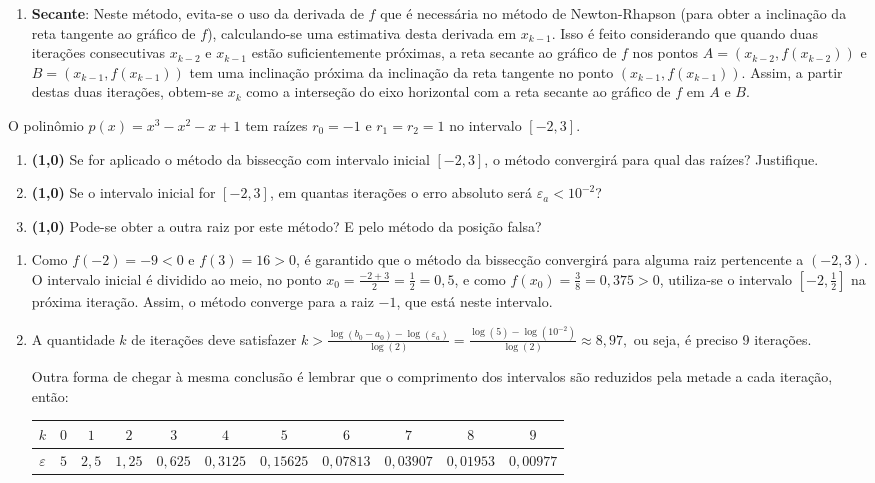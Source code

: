 \documentclass[12pt,a4paper]{article}
\begin{document}
\begin{ExerciseList}
\begin{enumerate}
\item \textbf{Secante}: Neste método, evita-se o uso da derivada de $f$ que é necessária no método de Newton-Rhapson (para obter a inclinação da reta tangente ao gráfico de $f$), calculando-se uma estimativa desta derivada em $x_{k-1}$. Isso é feito considerando que quando duas iterações consecutivas $x_{k-2}$ e $x_{k-1}$ estão suficientemente próximas, a reta secante ao gráfico de $f$ nos pontos $A = (x_{k-2}, f(x_{k-2}))$ e $B = (x_{k-1}, f(x_{k-1}))$ tem uma inclinação próxima da inclinação da reta tangente no ponto $(x_{k-1}, f(x_{k-1}))$. Assim, a partir destas duas iterações, obtem-se $x_k$ como a interseção do eixo horizontal com a reta secante ao gráfico de $f$ em $A$ e $B$.
\end{enumerate}

\Exercise%
O polinômio $p(x) = x^3 - x^2 - x + 1$ tem raízes $r_0 = -1$ e $r_1 = r_2 = 1$ no intervalo $[-2, 3]$.
\begin{enumerate}
\item \textbf{(1,0)} Se for aplicado o método da bissecção com intervalo inicial $[-2, 3]$, o método convergirá para qual das raízes? Justifique.
\item \textbf{(1,0)} Se o intervalo inicial for $[-2,3]$, em quantas iterações o erro absoluto será $\varepsilon_a < 10^{-2}$?
\item \textbf{(1,0)} Pode-se obter a outra raiz por este método? E pelo método da posição falsa?
\end{enumerate}
\Answer

\begin{enumerate}
\item Como $f(-2) = -9 < 0$ e $f(3) = 16 > 0$, é garantido que o método da bissecção convergirá para alguma raiz pertencente a $(-2, 3)$. O intervalo inicial é dividido ao meio, no ponto $x_0 = \frac{-2 + 3}{2} = \frac{1}{2} =0{,}5$, e como $f(x_0) = \frac{3}{8} = 0,375 > 0$, utiliza-se o intervalo $\left[-2, \frac{1}{2} \right]$ na próxima iteração. Assim, o método converge para a raiz $-1$, que está neste intervalo.
\item A quantidade $k$ de iterações deve satisfazer
$
k
> \frac{\log(b_0 - a_0) - \log(\varepsilon_a)}{\log(2)}
= \frac{\log(5) - \log(10^{-2})}{\log(2)}
\approx 8,97,
$
ou seja, é preciso 9 iterações.

Outra forma de chegar à mesma conclusão é lembrar que o comprimento dos intervalos são reduzidos pela metade a cada iteração, então:
\begin{center}
\begin{tabular}{|c|c|c|c|c|c|c|c|c|c|c|}
\hline
$k$ & $0$ & $1$ & $2$ & $3$ & $4$ & $5$ & $6$ & $7$ & $8$ & $9$ \\
\hline
$\varepsilon$ & $5$ & $2,5$ & $1,25$ & $0,625$ & $0,3125$ & $0,15625$ & $0,07813$ & $0,03907$ & $0,01953$ & $0,00977$ \\
\hline
\end{tabular}
\end{center}


\end{enumerate}
\end{ExerciseList}
\end{document}
